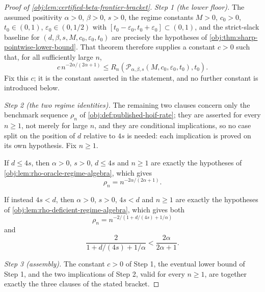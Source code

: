\begin{proof}[Proof of \cref{obj:lem:certified-beta-frontier-bracket}]
\emph{Step 1 (the lower floor).} The assumed positivity \(\alpha>0\), \(\beta>0\), \(s>0\), the
regime constants \(M>0\), \(c_0>0\), \(t_0\in(0,1)\), \(\varepsilon_0\in(0,1/2)\) with
\([t_0-\varepsilon_0,t_0+\varepsilon_0]\subset(0,1)\), and the strict-slack baseline for
\((d,\beta,s,M,c_0,\varepsilon_0,t_0)\) are precisely the hypotheses of
\cref{obj:thm:sharp-pointwise-lower-bound}. That theorem therefore supplies a constant \(c>0\) such
that, for all sufficiently large \(n\),
\[
c\,n^{-2\alpha/(2\alpha+1)}
\le
R_n\!\left(\mathcal P_{\alpha,\beta,s}(M,c_0,\varepsilon_0,t_0),t_0\right).
\]
Fix this \(c\); it is the constant asserted in the statement, and no further constant is introduced
below. %

\emph{Step 2 (the two regime identities).} The remaining two clauses concern only the benchmark
sequence \(\rho_n\) of \cref{obj:def:published-hoif-rate}; they are asserted for every \(n\ge1\),
not merely for large \(n\), and they are conditional implications, so no case split on the position
of \(d\) relative to \(4s\) is needed: each implication is proved on its own hypothesis. Fix
\(n\ge1\).

If \(d\le 4s\), then \(\alpha>0\), \(s>0\), \(d\le 4s\) and \(n\ge1\) are exactly the hypotheses of
\cref{obj:lem:rho-oracle-regime-algebra}, which gives
\[
\rho_n=n^{-2\alpha/(2\alpha+1)} .
\]

If instead \(4s<d\), then \(\alpha>0\), \(s>0\), \(4s<d\) and \(n\ge1\) are exactly the hypotheses of
\cref{obj:lem:rho-deficient-regime-algebra}, which gives both
\[
\rho_n=n^{-2/(1+d/(4s)+1/\alpha)}
\]
and
\[
\frac{2}{1+d/(4s)+1/\alpha}
<
\frac{2\alpha}{2\alpha+1}.
\]

\emph{Step 3 (assembly).} The constant \(c>0\) of Step 1, the eventual lower bound of Step 1, and
the two implications of Step 2, valid for every \(n\ge1\), are together exactly the three clauses of
the stated bracket.
\end{proof}
